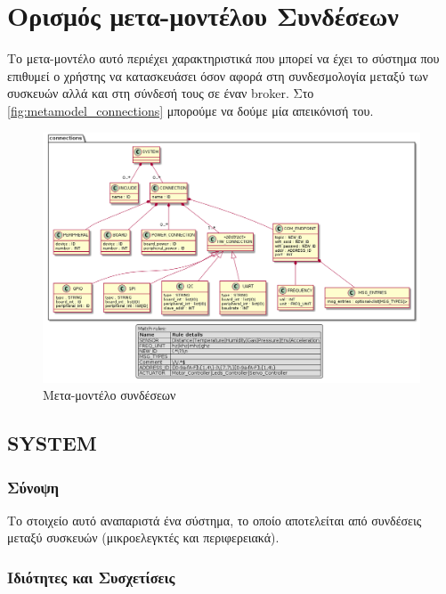 \section{Ορισμός μετα-μοντέλου Συνδέσεων}
\label{sec:metamodel_connections}

Το μετα-μοντέλο αυτό περιέχει χαρακτηριστικά που μπορεί να έχει το σύστημα που επιθυμεί ο χρήστης να κατασκευάσει όσον αφορά στη συνδεσμολογία μεταξύ των συσκευών αλλά και στη σύνδεσή τους σε έναν broker. Στο \autoref{fig:metamodel_connections} μπορούμε να δούμε μία απεικόνισή του.

\begin{figure}[!ht]
	\centering
	\includegraphics[width=1.0\textwidth]{./images/chapter5/metamodel_connections.png}
	\caption{Μετα-μοντέλο συνδέσεων}
	\label{fig:metamodel_connections}
\end{figure}

\subsection{SYSTEM}
\label{subsec:system}

\subsubsection*{Σύνοψη}

\noindent Το στοιχείο αυτό αναπαριστά ένα σύστημα, το οποίο αποτελείται από συνδέσεις μεταξύ συσκευών (μικροελεγκτές και περιφερειακά).

\subsubsection*{Ιδιότητες και Συσχετίσεις}

